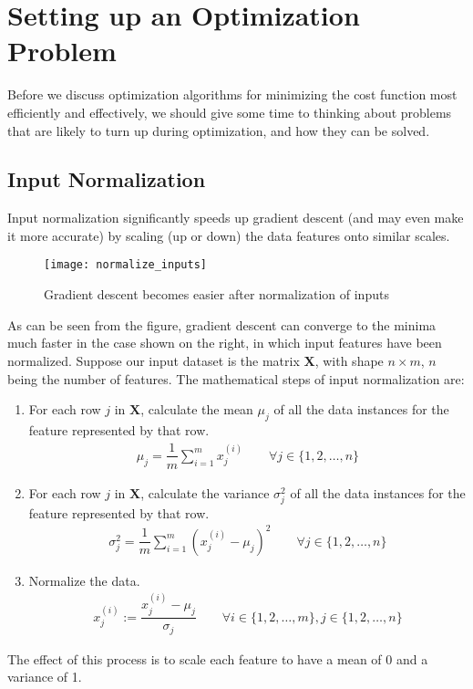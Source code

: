 \documentclass[a4paper, 12pt]{report}
\begin{document}
\newpage

\chapter{Setting up an Optimization Problem}
Before we discuss optimization algorithms for minimizing the cost function most efficiently and effectively, we should give some time to thinking about problems that are likely to turn up during optimization, and how they can be solved.

\section{Input Normalization}
Input normalization significantly speeds up gradient descent (and may even make it more accurate) by scaling (up or down) the data features onto similar scales.
\begin{figure}[H]
\centering
\texttt{[image: normalize\_inputs]}
\caption{Gradient descent becomes easier after normalization of inputs}
\end{figure}
As can be seen from the figure, gradient descent can converge to the minima much faster in the case shown on the right, in which input features have been normalized. Suppose our input dataset is the matrix $\bm{X}$, with shape $n\times m$, $n$ being the number of features. The mathematical steps of input normalization are:
\begin{enumerate}
\item For each row $j$ in $\bm{X}$, calculate the mean $\mu_j$ of all the data instances for the feature represented by that row.
\begin{align*}
\mu_j = \dfrac{1}{m}\sum_{i=1}^{m}x_{j}^{(i)} \quad\quad \forall j \in \{1, 2, \dots, n\}
\end{align*}
\item For each row $j$ in $\bm{X}$, calculate the variance $\sigma_j^2$ of all the data instances for the feature represented by that row.
\begin{align*}
\sigma_j^2 = \dfrac{1}{m}\sum_{i=1}^{m}\left(x_{j}^{(i)}-\mu_j\right)^2 \quad\quad \forall j \in \{1, 2, \dots, n\}
\end{align*}
\item Normalize the data.
\begin{align*}
x_{j}^{(i)} := \dfrac{x_{j}^{(i)} - \mu_j}{\sigma_j} \quad\quad \forall i \in \{1, 2, \dots, m\}, j \in \{1, 2, \dots, n\}
\end{align*}
\end{enumerate}
The effect of this process is to scale each feature to have a mean of 0 and a variance of 1.
\end{document}
